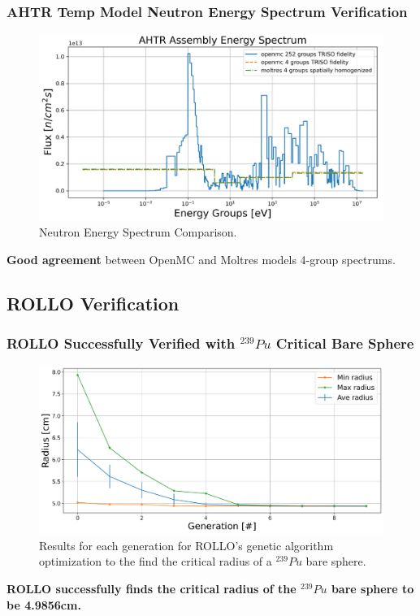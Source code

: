 \begin{frame}
    \frametitle{AHTR Temp Model Neutron Energy Spectrum Verification}
            \begin{figure}[]
                \centering
                \includegraphics[width=0.75\linewidth]{figures/benchmark-spectrum.png} 
                \caption{Neutron Energy Spectrum Comparison.}
            \end{figure}
        \textbf{Good agreement} between OpenMC and Moltres models 4-group spectrums.
\end{frame}

\subsection{ROLLO Verification}
\begin{frame}
    \frametitle{ROLLO Successfully Verified with $^{239}Pu$ Critical Bare Sphere}
    \begin{figure}
        \includegraphics[width=0.85\linewidth]{../docs/figures/radius-convergence.png} 
        \caption{Results for each generation for \gls{ROLLO}'s genetic algorithm 
        optimization to the find the critical radius of a  $^{239}Pu$ bare sphere.}
    \end{figure}
    \vspace{-0.2cm}
    \textbf{ROLLO successfully finds the critical radius of the $^{239}Pu$ bare sphere 
    to be 4.9856cm.}
\end{frame}

